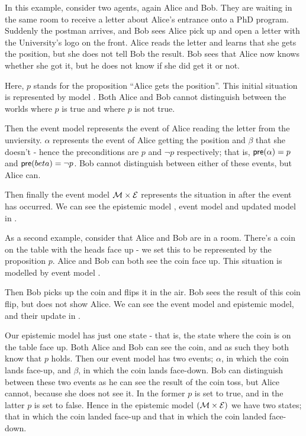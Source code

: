 \documentclass[12pt, a4paper]{article}
\begin{document}
In this example, consider two agents, again Alice and Bob. They are waiting in
the same room to receive a letter about Alice's entrance onto a PhD program.
Suddenly the postman arrives, and Bob sees Alice pick up and open a letter with
the University's logo on the front. Alice reads the letter and learns that she
gets the position, but she does not tell Bob the result. Bob sees that Alice now
knows whether she got it, but he does not know if she did get it or not.

Here, $p$ stands for the proposition ``Alice gets the position''. This initial
situation is represented by model . Both Alice and Bob cannot distinguish
between the worlds where $p$ is true and where $p$ is not true. 

Then the event model  represents the event of Alice reading the letter
from the unviersity. $\alpha$ represents the event of Alice getting the position
and $\beta$ that she doesn't - hence the preconditions are $p$ and $\neg
p$ respectively; that is, $\textsf{pre}(\alpha) = p$ and $\textsf{pre}(beta) = \neg p$. Bob
cannot distinguish between either of these events, but Alice can.

Then finally the event model $\mathcal{M} \times \mathcal{E}$ represents the situation
in  after the event  has occurred. We can see the epistemic model ,
event model  and updated model  in .

\bigskip

As a second example, consider that Alice and Bob are in a room. There's a coin
on the table with the heads face up - we set this to be represented by the
proposition $p$. Alice and Bob can both see the coin face up. This situation is
modelled by event model .

Then Bob picks up the coin and flips it in the air. Bob sees the result of this
coin flip, but does not show Alice. We can see the event model and epistemic
model, and their update in .

Our epistemic model has just one state - that is, the state where the coin is on
the table face up. Both Alice and Bob can see the coin, and as such they both
know that $p$ holds. Then our event model has two events; $\alpha$, in which the
coin lands face-up, and $\beta$, in which the coin lands face-down. Bob can
distinguish between these two events as he can see the result of the coin toss,
but Alice cannot, because she does not see it. In the former $p$ is set to true,
and in the latter $p$ is set to false. Hence in the epistemic model $(\mathcal{M}
\times \mathcal{E})$ we have two states; that in which the coin landed face-up and
that in which the coin landed face-down.
\end{document}
